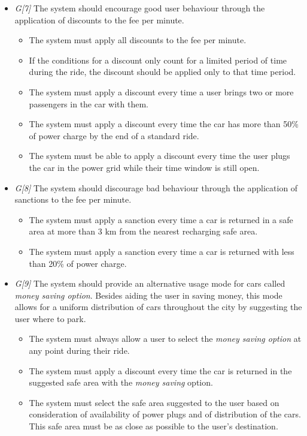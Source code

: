\begin{itemize}
				\item \textit{G[7]} The system should encourage good user behaviour through the application of discounts to the fee per minute. 
					\begin{itemize}
						\item The system must apply all discounts to the fee per minute.
						\item If the conditions for a discount only count for a limited period of time during the ride, the discount should be applied only to that time period. %
						\item The system must apply a discount every time a user brings two or more passengers in the car with them.
						\item The system must apply a discount every time the car has more than 50\% of power charge by the end of a standard ride. %
						\item The system must be able to apply a discount every time the user plugs the car in the power grid while their time window is still open.
					\end{itemize}
					
				\item \textit{G[8]} The system should discourage bad behaviour through the application of sanctions to the fee per minute.
					\begin{itemize}
						\item The system must apply a sanction every time a car is returned in a safe area at more than 3 km from the nearest recharging safe area.
						\item The system must apply a sanction every time a car is returned with less than 20\% of power charge.
					\end{itemize}
					
				\item \textit{G[9]} The system should provide an alternative usage mode for cars called \textit{money saving option}. Besides aiding the user in saving money, this mode allows for a uniform distribution of cars throughout the city by suggesting the user where to park.
					\begin{itemize}
						\item The system must always allow a user to select the \textit{money saving option} at any point during their ride. 
						\item The system must apply a discount every time the car is returned in the suggested safe area with the \textit{money saving} option.
						\item The system must select the safe area suggested to the user based on consideration of availability of power plugs and of distribution of the cars. This safe area must be as close as possible to the user's destination. %
					\end{itemize}
					

\end{itemize}
